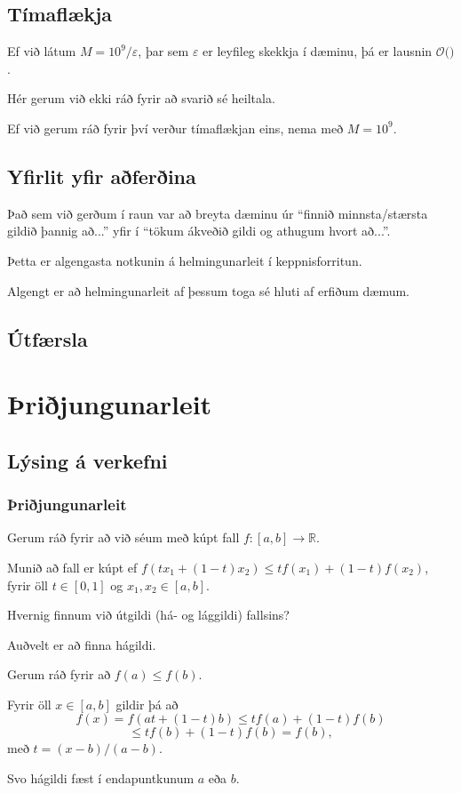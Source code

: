 \subsection{Tímaflækja}
{
    {
        \item<1-> Ef við látum $M = 10^9/\varepsilon$, þar sem $\varepsilon$ er leyfileg skekkja í dæminu, þá er lausnin
            $\mathcal{O}($$)$.
        \item<3-> Hér gerum við ekki ráð fyrir að svarið sé heiltala.
        \item<4-> Ef við gerum ráð fyrir því verður tímaflækjan eins, nema með $M = 10^9$.
    }
}

\subsection{Yfirlit yfir aðferðina}
{
    {
        \item<1-> Það sem við gerðum í raun var að breyta dæminu úr ``finnið minnsta/stærsta gildið þannig að...''
                    yfir í ``tökum ákveðið gildi og athugum hvort að...''.
        \item<2-> Þetta er algengasta notkunin á helmingunarleit í keppnisforritun.
        \item<3-> Algengt er að helmingunarleit af þessum toga sé hluti af erfiðum dæmum.
    }
}

\subsection{Útfærsla}
{
}

\section{Þriðjungunarleit}
\subsection{Lýsing á verkefni}
{
    {
        \frametitle{Þriðjungunarleit}
        \item<1-> Gerum ráð fyrir að við séum með kúpt fall $f \colon [a, b] \rightarrow \mathbb{R}$.
        \item<2-> Munið að fall er kúpt ef $f(tx_1 + (1 - t)x_2) \leq tf(x_1) + (1 - t)f(x_2)$, fyrir öll $t \in [0, 1]$ og $x_1, x_2 \in [a, b]$.
        \item<3-> Hvernig finnum við útgildi (há- og lággildi) fallsins?
        \item<4-> Auðvelt er að finna hágildi.
        \item<5-> Gerum ráð fyrir að $f(a) \leq f(b)$.
        \item<6-> Fyrir öll $x \in [a, b]$ gildir þá að
        \[
            f(x) = f(at + (1 - t)b) \leq tf(a) + (1 - t)f(b)
        \]
        \[
            \leq tf(b) + (1 - t)f(b) = f(b),
        \]
        með $t = (x - b)/(a - b)$.
        \item<7-> Svo hágildi fæst í endapuntkunum $a$ eða $b$.
    }
}

